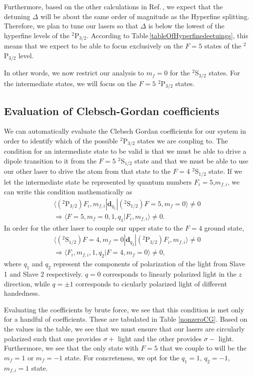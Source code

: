 Furthermore, based on the other calculations in Ref.\,\cite{cjeDiss}, we expect that the detuning $\Delta$ will be about the same order of magnitude as the Hyperfine splitting. Therefore, we plan to tune our lasers so that $\Delta$ is below the lowest of the hyperfine levels of the $^2$P$_{3/2}$. According to Table\,\ref{tableOfHyperfinedeetuings}, this means that we expect to be able to focus exclusively on the $F=5$ states of the $^2$P$_{3/2}$ level.

In other words, we now restrict our analysis to $m_f=0$ for the $^2$S$_{3/2}$ states. For the intermediate states, we will focus on the $F=5$ $^2$P$_{3/2}$ states. 

\subsection{Evaluation of Clebsch-Gordan coefficients}

We can automatically evaluate the Clebsch Gordan coefficients for our system in order to identify which of the possible $^2$P$_{3/2}$ states we are coupling to. The condition for an intermediate state to be valid is that we must be able to drive a dipole transition to it from the $F=5$ $^2$S$_{1/2}$ state and that we must be able to use our other laser to drive the atom from that state to the $F=4$ $^2$S$_{1/2}$ state. If we let the intermediate state be represented by quantum numbers $F_i=5$,$m_{f,i}$, we can write this condition mathematically as  
\begin{multline}
\langle (^2\mathrm{P}_{3/2}) F_i,m_{f,i}|\mathbf{d}_{q_1}|(^2\mathrm{S}_{1/2})F=5,m_f=0\rangle\neq 0 \\
\Rightarrow \langle F=5,m_f=0,1,q_1|F_i,m_{f,i}\rangle \neq 0  \label{thing1}.
\end{multline}
In order for the other laser to couple our upper state to the $F=4$ ground state, 
\begin{multline}
\langle (^2\mathrm{S}_{1/2})F=4,m_f=0|\mathbf{d}_{q_2}|(^2\mathrm{P}_{3/2}) F_i,m_{f,i}\rangle\neq 0 \\
\Rightarrow
\langle F_i,m_{f,i},1,q_2|F=4,m_f=0 \rangle \neq 0 \label{thing2},
\end{multline}
where $q_1$ and $q_2$ represent the components of polarization of the light from Slave 1 and Slave 2 respectively. $q=0$ corresponds to linearly polarized light in the $z$ direction, while $q=\pm 1$ corresponds to cicularly polarized light of different handedness.

Evaluating the coefficients by brute force, we see that this condition is met only for a handful of coefficients. These are tabulated in Table \ref{nonzeroCG}. Based on the values in the table, we see that we must ensure that our lasers are circularly polarized such that one provides $\sigma+$ light and the other provides $\sigma-$ light. Furthermore, we see that the only state with $F=5$ that we couple to will be the $m_f=1$ or $m_f=-1$ state. For concreteness, we opt for the $q_1=1$, $q_2=-1$,$m_{f,i}=1$ state. 


